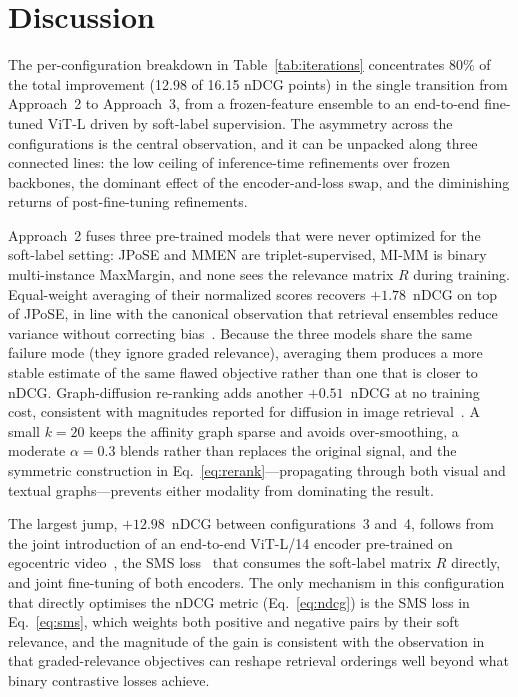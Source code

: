 \section{Discussion}
\label{sec:discussion}

The per-configuration breakdown in Table~\ref{tab:iterations} concentrates 80\% of the total improvement (12.98 of 16.15 nDCG points) in the single transition from Approach~2 to Approach~3, from a frozen-feature ensemble to an end-to-end fine-tuned ViT-L driven by soft-label supervision. The asymmetry across the configurations is the central observation, and it can be unpacked along three connected lines: the low ceiling of inference-time refinements over frozen backbones, the dominant effect of the encoder-and-loss swap, and the diminishing returns of post-fine-tuning refinements.

Approach~2 fuses three pre-trained models that were never optimized for the soft-label setting: JPoSE and MMEN are triplet-supervised, MI-MM is binary multi-instance MaxMargin, and none sees the relevance matrix $R$ during training. Equal-weight averaging of their normalized scores recovers $+1.78$~nDCG on top of JPoSE, in line with the canonical observation that retrieval ensembles reduce variance without correcting bias~\cite{wortsman2022modelsoups}. Because the three models share the same failure mode (they ignore graded relevance), averaging them produces a more stable estimate of the same flawed objective rather than one that is closer to nDCG. Graph-diffusion re-ranking adds another $+0.51$~nDCG at no training cost, consistent with magnitudes reported for diffusion in image retrieval~\cite{iscen2017diffusion}. A small $k=20$ keeps the affinity graph sparse and avoids over-smoothing, a moderate $\alpha=0.3$ blends rather than replaces the original signal, and the symmetric construction in Eq.~\eqref{eq:rerank}---propagating through both visual and textual graphs---prevents either modality from dominating the result.

The largest jump, $+12.98$~nDCG between configurations~3 and~4, follows from the joint introduction of an end-to-end ViT-L/14 encoder pre-trained on egocentric video~\cite{zhao2023avion,zhao2023lavila}, the SMS loss~\cite{wang2024symmetricmultisimilaritylossepickitchens100} that consumes the soft-label matrix $R$ directly, and joint fine-tuning of both encoders. The only mechanism in this configuration that directly optimises the nDCG metric (Eq.~\eqref{eq:ndcg}) is the SMS loss in Eq.~\eqref{eq:sms}, which weights both positive and negative pairs by their soft relevance, and the magnitude of the gain is consistent with the observation in~\cite{wray2021semantic} that graded-relevance objectives can reshape retrieval orderings well beyond what binary contrastive losses achieve.

